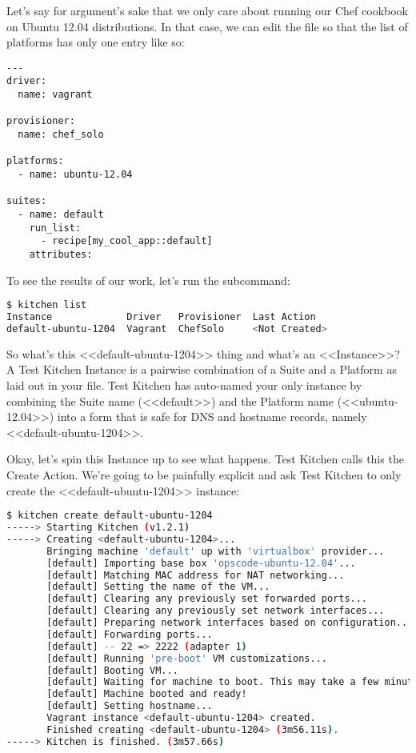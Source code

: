 Let's say for argument's sake that we only care about running our Chef cookbook on Ubuntu 12.04 distributions. In that case, we can edit the  file so that the list of platforms has only one entry like so:

\begin{lstlisting}[label=lst:testing-test-kitchen5]
---
driver:
  name: vagrant

provisioner:
  name: chef_solo

platforms:
  - name: ubuntu-12.04

suites:
  - name: default
    run_list:
      - recipe[my_cool_app::default]
    attributes:
\end{lstlisting}

To see the results of our work, let's run the  subcommand:

\begin{lstlisting}[language=Bash,label=lst:testing-test-kitchen6]
$ kitchen list
Instance             Driver   Provisioner  Last Action
default-ubuntu-1204  Vagrant  ChefSolo     <Not Created>
\end{lstlisting}

So what's this <<default-ubuntu-1204>> thing and what's an <<Instance>>? A Test Kitchen Instance is a pairwise combination of a Suite and a Platform as laid out in your  file. Test Kitchen has auto-named your only instance by combining the Suite name (<<default>>) and the Platform name (<<ubuntu-12.04>>) into a form that is safe for DNS and hostname records, namely <<default-ubuntu-1204>>.

Okay, let's spin this Instance up to see what happens. Test Kitchen calls this the Create Action. We're going to be painfully explicit and ask Test Kitchen to only create the <<default-ubuntu-1204>> instance:

\begin{lstlisting}[language=Bash,label=lst:testing-test-kitchen7]
$ kitchen create default-ubuntu-1204
-----> Starting Kitchen (v1.2.1)
-----> Creating <default-ubuntu-1204>...
       Bringing machine 'default' up with 'virtualbox' provider...
       [default] Importing base box 'opscode-ubuntu-12.04'...
       [default] Matching MAC address for NAT networking...
       [default] Setting the name of the VM...
       [default] Clearing any previously set forwarded ports...
       [default] Clearing any previously set network interfaces...
       [default] Preparing network interfaces based on configuration...
       [default] Forwarding ports...
       [default] -- 22 => 2222 (adapter 1)
       [default] Running 'pre-boot' VM customizations...
       [default] Booting VM...
       [default] Waiting for machine to boot. This may take a few minutes...
       [default] Machine booted and ready!
       [default] Setting hostname...
       Vagrant instance <default-ubuntu-1204> created.
       Finished creating <default-ubuntu-1204> (3m56.11s).
-----> Kitchen is finished. (3m57.66s)
\end{lstlisting}

